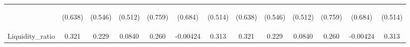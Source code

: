 \documentclass[]{article}
\begin{document}
\begin{center}
\begin{tabular}{lcccccccccccc}
\vspace{4pt} & \begin{footnotesize}(0.638)\end{footnotesize} & \begin{footnotesize}(0.546)\end{footnotesize} & \begin{footnotesize}(0.512)\end{footnotesize} & \begin{footnotesize}(0.759)\end{footnotesize} & \begin{footnotesize}(0.684)\end{footnotesize} & \begin{footnotesize}(0.514)\end{footnotesize} & \begin{footnotesize}(0.638)\end{footnotesize} & \begin{footnotesize}(0.546)\end{footnotesize} & \begin{footnotesize}(0.512)\end{footnotesize} & \begin{footnotesize}(0.759)\end{footnotesize} & \begin{footnotesize}(0.684)\end{footnotesize} & \begin{footnotesize}(0.514)\end{footnotesize} \\
Liquidity\_ratio & 0.321 & 0.229 & 0.0840 & 0.260 & -0.00424 & 0.313 & 0.321 & 0.229 & 0.0840 & 0.260 & -0.00424 & 0.313 \\

\end{tabular}
\end{center}
\end{document}
